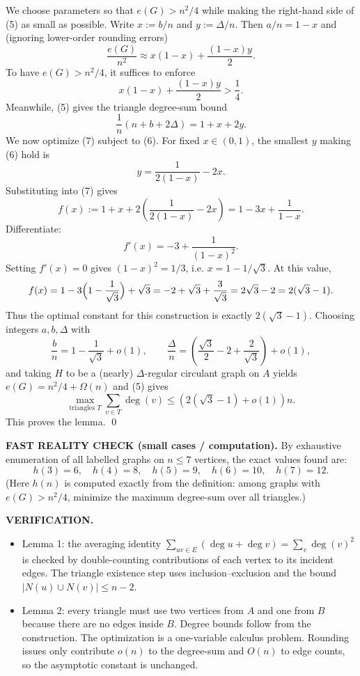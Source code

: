We choose parameters so that $e(G)>n^2/4$ while making the right-hand side of (5) as small as possible.
Write $x:=b/n$ and $y:=\Delta/n$.
Then $a/n=1-x$ and (ignoring lower-order rounding errors)
\[
\frac{e(G)}{n^2} \approx x(1-x) + \frac{(1-x)y}{2}.
\]
To have $e(G)>n^2/4$, it suffices to enforce
\[
 x(1-x) + \frac{(1-x)y}{2} > \frac{1}{4}. \tag{6}
\]
Meanwhile, (5) gives the triangle degree-sum bound
\[
\frac{1}{n}(n+b+2\Delta) = 1 + x + 2y. \tag{7}
\]
We now optimize (7) subject to (6).
For fixed $x\in(0,1)$, the smallest $y$ making (6) hold is
\[
 y = \frac{1}{2(1-x)} - 2x.
\]
Substituting into (7) gives
\[
 f(x) := 1 + x + 2\left(\frac{1}{2(1-x)} - 2x\right) = 1 - 3x + \frac{1}{1-x}.
\]
Differentiate:
\[
 f'(x) = -3 + \frac{1}{(1-x)^2}.
\]
Setting $f'(x)=0$ gives $(1-x)^2=1/3$, i.e. $x=1-1/\sqrt{3}$.
At this value,
\[
 f(x)=1-3\Bigl(1-\frac{1}{\sqrt{3}}\Bigr) + \sqrt{3} = -2 + \sqrt{3} + \frac{3}{\sqrt{3}} = 2\sqrt{3}-2 = 2(\sqrt{3}-1).
\]
Thus the optimal constant for this construction is exactly $2(\sqrt{3}-1)$.
Choosing integers $a,b,\Delta$ with
\[
\frac{b}{n}=1-\frac{1}{\sqrt{3}}+o(1),\qquad \frac{\Delta}{n}=\left(\frac{\sqrt{3}}{2}-2+\frac{2}{\sqrt{3}}\right)+o(1),
\]
and taking $H$ to be a (nearly) $\Delta$-regular circulant graph on $A$ yields $e(G)=n^2/4+\Omega(n)$ and (5) gives
\[
\max_{\text{triangles }T} \sum_{v\in T}\deg(v) \le \left(2(\sqrt{3}-1)+o(1)\right)n.
\]
This proves the lemma.
\qed

\medskip
\textbf{FAST REALITY CHECK (small cases / computation).}
By exhaustive enumeration of all labelled graphs on $n\le 7$ vertices, the exact values found are:
\[
 h(3)=6,\quad h(4)=8,\quad h(5)=9,\quad h(6)=10,\quad h(7)=12.
\]
(Here $h(n)$ is computed exactly from the definition: among graphs with $e(G)>n^2/4$, minimize the maximum degree-sum over all triangles.)

\textbf{VERIFICATION.}
\begin{itemize}
\item Lemma 1: the averaging identity $\sum_{uv\in E}(\deg u+\deg v)=\sum_v \deg(v)^2$ is checked by double-counting contributions of each vertex to its incident edges.
The triangle existence step uses inclusion--exclusion and the bound $|N(u)\cup N(v)|\le n-2$.
\item Lemma 2: every triangle must use two vertices from $A$ and one from $B$ because there are no edges inside $B$.
Degree bounds follow from the construction. The optimization is a one-variable calculus problem.
Rounding issues only contribute $o(n)$ to the degree-sum and $O(n)$ to edge counts, so the asymptotic constant is unchanged.
\end{itemize}

